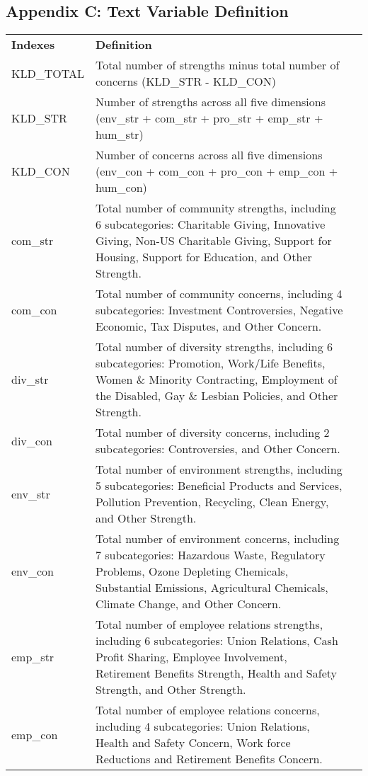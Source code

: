 \documentclass[a4paper]{article}
\begin{document}
\subsection{Appendix C: Text Variable Definition}
\begin{table}[H]
	\centering
	\begin{tabular}{lp{15cm}p{15cm}}
		\textbf{Indexes} & \textbf{Definition} \\
		KLD\_TOTAL &  Total number of strengths minus total number of concerns (KLD\_STR - KLD\_CON) \\
		KLD\_STR &  Number of strengths across all five dimensions (env\_str + com\_str + pro\_str + emp\_str + hum\_str) \\
		KLD\_CON &  Number of concerns across all five dimensions (env\_con + com\_con + pro\_con + emp\_con + hum\_con) \\
		com\_str  &  Total number of community strengths, including 6 subcategories: Charitable Giving, Innovative Giving, Non-US Charitable Giving, Support for Housing, Support for Education, and Other Strength. \\
		com\_con  &  Total number of community concerns, including 4 subcategories: Investment Controversies, Negative Economic, Tax Disputes, and Other Concern. \\
		div\_str  &  Total number of diversity strengths, including 6 subcategories: Promotion, Work/Life Benefits, Women \& Minority Contracting, Employment of the Disabled, Gay \& Lesbian Policies, and Other Strength. \\
		div\_con  &  Total number of diversity concerns, including 2 subcategories: Controversies, and Other Concern. \\
		env\_str  &  Total number of environment strengths, including 5 subcategories: Beneficial Products and Services, Pollution Prevention, Recycling, Clean Energy, and Other Strength. \\
		env\_con  &  Total number of environment concerns, including 7 subcategories: Hazardous Waste, Regulatory Problems, Ozone Depleting Chemicals, Substantial Emissions, Agricultural Chemicals, Climate Change, and Other Concern. \\
		emp\_str  &  Total number of employee relations strengths, including 6 subcategories: Union Relations, Cash Profit Sharing, Employee Involvement, Retirement Benefits Strength, Health and Safety Strength, and Other Strength. \\
		emp\_con  &  Total number of employee relations concerns, including 4 subcategories: Union Relations, Health and Safety Concern, Work force Reductions and Retirement Benefits Concern. \\

\end{tabular}
\end{table}
\end{document}
